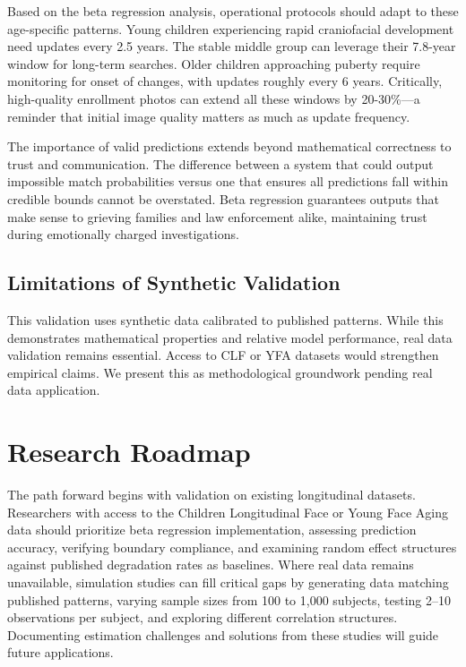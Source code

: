 \documentclass[10pt,journal,compsoc]{IEEEtran}
\begin{document}
Based on the beta regression analysis, operational protocols should adapt to these age-specific patterns. Young children experiencing rapid craniofacial development need updates every 2.5 years. The stable middle group can leverage their 7.8-year window for long-term searches. Older children approaching puberty require monitoring for onset of changes, with updates roughly every 6 years. Critically, high-quality enrollment photos can extend all these windows by 20-30\%---a reminder that initial image quality matters as much as update frequency.

The importance of valid predictions extends beyond mathematical correctness to trust and communication. The difference between a system that could output impossible match probabilities versus one that ensures all predictions fall within credible bounds cannot be overstated. Beta regression guarantees outputs that make sense to grieving families and law enforcement alike, maintaining trust during emotionally charged investigations.

\subsection{Limitations of Synthetic Validation}
This validation uses synthetic data calibrated to published patterns. While this demonstrates mathematical properties and relative model performance, real data validation remains essential. Access to CLF or YFA datasets would strengthen empirical claims. We present this as methodological groundwork pending real data application.

\section{Research Roadmap}
\label{sec:roadmap}

The path forward begins with validation on existing longitudinal datasets. Researchers with access to the Children Longitudinal Face or Young Face Aging data should prioritize beta regression implementation, assessing prediction accuracy, verifying boundary compliance, and examining random effect structures against published degradation rates as baselines. Where real data remains unavailable, simulation studies can fill critical gaps by generating data matching published patterns, varying sample sizes from 100 to 1,000 subjects, testing 2--10 observations per subject, and exploring different correlation structures. Documenting estimation challenges and solutions from these studies will guide future applications.
\end{document}
